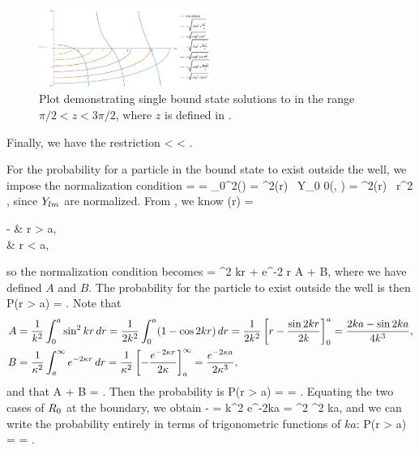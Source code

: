 \begin{solution}
	\begin{figure} \centering
		\includegraphics[width=0.5\textwidth]{plot2}
		\caption{Plot demonstrating single bound state solutions to  in the range $\pi/2 < z < 3\pi/2$, where $z$ is defined in .}
		\label{plot2}
	\end{figure}
	
	Finally, we have the restriction
	\beqn \label{range}
		 \leq {} < 
		\qimplies
		 \leq \Vo < .
	\eeqn
	
	For the probability for a particle in the bound state to exist outside the well, we impose the normalization condition
	 = \braket{\psi}
		= \int \psi_0^2(\vr) \dcx
		= \int \Ro^2(r) \, Y_{0 0}(\tht, \phi) \dcx
		= \intoi \Ro^2(r) \, r^2 \dr,
	\eeq
	since $Y_{l m}$ are normalized.  From , we know
	\beq
		\Ro(r) = \begin{cases}
			- & r > a, \\[2ex]
			 & r < a,
		\end{cases}
	\eeq
	so the normalization condition becomes
	 =  \intoa \sin^2 kr \dr +  \intai e^{-2 \kap r} \dr
		\equiv A + B,
	\eeq
	where we have defined $A$ and $B$.  The probability for the particle to exist outside the well is then
	\beq
		P(r > a) = .
	\eeq
	Note that
	\begin{align*}
		A &= \frac{1}{k^2} \int_0^a \sin^2 kr \dd{r}
		= \frac{1}{2 k^2} \int_0^a (1 - \cos 2kr) \dd{r}
		= \frac{1}{2 k^2} \left[ r - \frac{\sin 2kr}{2k} \right]_0^a
		= \frac{2 ka - \sin 2ka}{4 k^3}, \\
		B &= \frac{1}{\kappa^2} \int_a^\infty e^{-2 \kappa r} \dd{r}
		= \frac{1}{\kappa^2} \left[ -\frac{e^{-2 \kappa r}}{2 \kappa} \right]_a^\infty
		= \frac{e^{-2 \kappa a}}{2 \kappa^3},
	\end{align*}
	and that
	\beq
		A + B = .
	\eeq
	Then the probability is
	\beq
		P(r > a) =  
		= .
	\eeq
	Equating the two cases of $R_0$ at the boundary, we obtain
	\beq
		- = 
		\qimplies
		k^2 e^{-2ka} = \kap^2 \sin^2 ka,
	\eeq
	and we can write the probability entirely in terms of trigonometric functions of $ka$:
	\beq
		P(r > a) = 
		= .
	\eeq
	\vfix
\end{solution}



